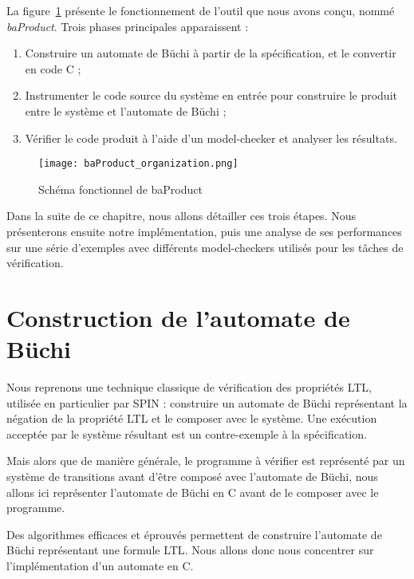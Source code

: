 La figure~\ref{fig:baProduct_func} présente le fonctionnement de l'outil que
nous avons conçu, nommé \emph{baProduct}. Trois phases principales
apparaissent :

\begin{enumerate}
\def\labelenumi{\arabic{enumi})}
  \item Construire un automate de Büchi à partir de la spécification, et le
    convertir en code C ;
  \item Instrumenter le code source du système en entrée pour construire le
    produit entre le système et l'automate de Büchi ;
  \item Vérifier le code produit à l'aide d'un model-checker et analyser les
    résultats.
\end{enumerate}

\begin{figure}
\begin{center}
  \texttt{[image: baProduct\_organization.png]}
\end{center}
\caption{Schéma fonctionnel de baProduct}
\label{fig:baProduct_func}
\end{figure}

Dans la suite de ce chapitre, nous allons détailler ces trois étapes. Nous
présenterons ensuite notre implémentation, puis une analyse de ses performances
sur une série d'exemples avec différents model-checkers utilisés pour les tâches
de vérification.

\section{Construction de l'automate de Büchi}

Nous reprenons une technique classique de vérification des propriétés \ac{LTL},
utilisée en particulier par SPIN\cite{SPIN} : construire un automate de Büchi
représentant la négation de la propriété \ac{LTL} et le composer avec le
système. Une exécution acceptée par le système résultant est un contre-exemple à
la spécification.

Mais alors que de manière générale, le programme à vérifier est représenté par
un système de transitions avant d'être composé avec l'automate de Büchi, nous
allons ici représenter l'automate de Büchi en C avant de le composer avec le
programme.

Des algorithmes efficaces et éprouvés permettent de construire l'automate de
Büchi représentant une formule \ac{LTL}\cite{ltl2ba}. Nous allons donc nous
concentrer sur l'implémentation d'un automate en C.

